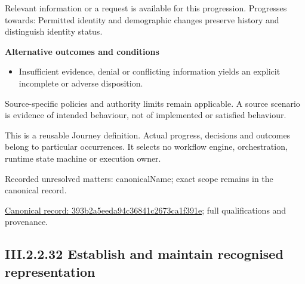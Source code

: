 Relevant information or a request is available for this progression. Progresses towards: Permitted identity and demographic changes preserve history and distinguish identity status.



\par\medskip\textbf{Alternative outcomes and conditions}\par


\begin{itemize}


\item Insufficient evidence, denial or conflicting information yields an explicit incomplete or adverse disposition.

\end{itemize}


Source-specific policies and authority limits remain applicable. A source scenario is evidence of intended behaviour, not of implemented or satisfied behaviour.



This is a reusable Journey definition. Actual progress, decisions and outcomes belong to particular occurrences. It selects no workflow engine, orchestration, runtime state machine or execution owner.


{\small Recorded unresolved matters: canonicalName; exact scope remains in the canonical record.}\par
{\footnotesize \href{../../../../continuum/strategy/value-stream/393b2a5eeda94c36841c2673ca1f391e.md}{Canonical record: 393b2a5eeda94c36841c2673ca1f391e}; full qualifications and provenance.}\par
\subsection*{III.2.2.32 Establish and maintain recognised representation}
\label{navigation:III.2.2.32}

